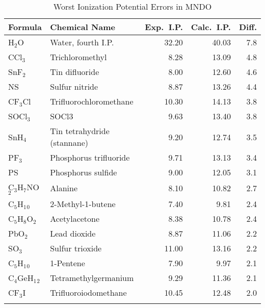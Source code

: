 \begin{table}
\caption{\label{weimndo} Worst Ionization Potential  Errors in MNDO}
\compresstable
\begin{center}
\begin{tabular}{llrrr}
 Formula & Chemical Name & Exp.\ I.P. & Calc.\   I.P.       & Diff.\\
\hline
 H$_2$O               & Water, fourth I.P.                     &   32.20   &    40.03   &    7.8\\
 CCl$_3$              & Trichloromethyl                        &    8.28   &    13.09   &    4.8\\
 SnF$_2$              & Tin difluoride                         &    8.00   &    12.60   &    4.6\\
 NS                   & Sulfur nitride                         &    8.87   &    13.26   &    4.4\\
 CF$_3$Cl             & Trifluorochloromethane                 &   10.30   &    14.13   &    3.8\\
 SOCl$_3$             & SOCl3                                  &    9.63   &    13.40   &    3.8\\
 SnH$_4$              & Tin tetrahydride (stannane)            &    9.20   &    12.74   &    3.5\\
 PF$_3$               & Phosphorus trifluoride                 &    9.71   &    13.13   &    3.4\\
 PS                   & Phosphorus sulfide                     &    9.00   &    12.05   &    3.1\\
 C$_3$H$_7$NO$_2$     & Alanine                                &    8.10   &    10.82   &    2.7\\
 C$_5$H$_1$$_0$       & 2-Methyl-1-butene                      &    7.40   &     9.81   &    2.4\\
 C$_5$H$_8$O$_2$      & Acetylacetone                          &    8.38   &    10.78   &    2.4\\
 PbO$_2$              & Lead dioxide                           &    8.87   &    11.06   &    2.2\\
 SO$_3$               & Sulfur trioxide                        &   11.00   &    13.16   &    2.2\\
 C$_5$H$_1$$_0$       & 1-Pentene                              &    7.90   &     9.97   &    2.1\\
 C$_4$GeH$_1$$_2$     & Tetramethylgermanium                   &    9.29   &    11.36   &    2.1\\
 CF$_3$I              & Trifluoroiodomethane                   &   10.45   &    12.48   &    2.0\\
$$
\end{tabular}
\end{center}
\end{table}
